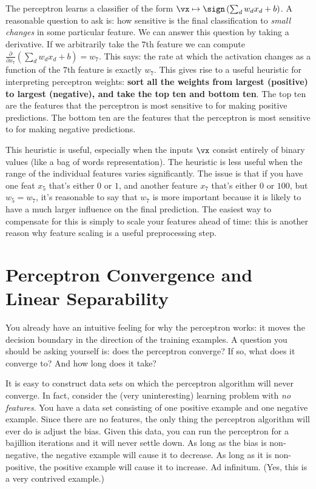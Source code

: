 The perceptron learns a classifier of the form $\vx \mapsto \sign\left( \sum_d w_d x_d + b \right)$.
A reasonable question to ask is: how sensitive is the final classification to \emph{small changes} in some particular feature.
We can answer this question by taking a derivative.
If we arbitrarily take the $7$th feature we can compute $\frac \partial {\partial x_7} \left( \sum_d w_d x_d + b \right) = w_7$.
This says: the rate at which the activation changes as a function of the $7$th feature is exactly $w_7$.
This gives rise to a useful heuristic for interpreting perceptron weights:
\textbf{sort all the weights from largest (positive) to largest (negative), and take the top ten and bottom ten}.
The top ten are the features that the perceptron is most sensitive to for making positive predictions.
The bottom ten are the features that the perceptron is most sensitive to for making negative predictions.

This heuristic is useful, especially when the inputs $\vx$ consist entirely of binary values (like a bag of words representation).
The heuristic is less useful when the range of the individual features varies significantly.
The issue is that if you have one feat $x_5$ that's either $0$ or $1$, and another feature $x_7$ that's either $0$ or $100$, but $w_5 = w_7$, it's reasonable to say that $w_7$ is more important because it is likely to have a much larger influence on the final prediction.
The easiest way to compensate for this is simply to scale your features ahead of time:
this is another reason why feature scaling is a useful preprocessing step.


\section{Perceptron Convergence and Linear Separability}

You already have an intuitive feeling for why the perceptron works: it
moves the decision boundary in the direction of the training
examples.  A question you should be asking yourself is: does the
perceptron converge?  If so, what does it converge to?  And how long
does it take?

It is easy to construct data sets on which the perceptron algorithm
will never converge.  In fact, consider the (very uninteresting)
learning problem with \emph{no features}.  You have a data set
consisting of one positive example and one negative example.  Since
there are no features, the only thing the perceptron algorithm will
ever do is adjust the bias.  Given this data, you can run the
perceptron for a bajillion iterations and it will never settle down.
As long as the bias is non-negative, the negative example will cause
it to decrease.  As long as it is non-positive, the positive example
will cause it to increase.  Ad infinitum.  (Yes, this is a very
contrived example.)

